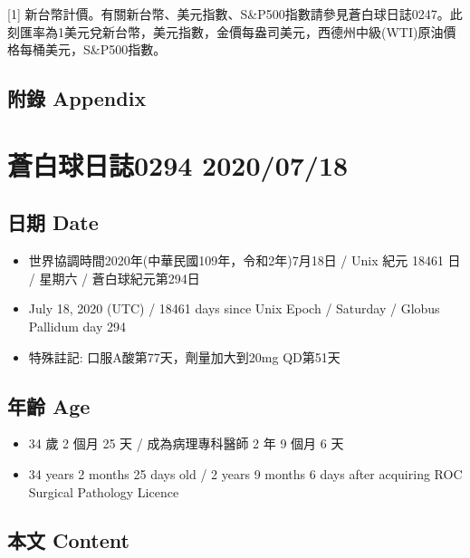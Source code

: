 \documentclass[a5paper, 11pt
]{book}
\providecommand{\tightlist}{%
  \setlength{\itemsep}{0pt}\setlength{\parskip}{0pt}}
\begin{document}
{[}1{]}
新台幣計價。有關新台幣、美元指數、S\&P500指數請參見蒼白球日誌0247。此刻匯率為1美元兌新台幣，美元指數，金價每盎司美元，西德州中級(WTI)原油價格每桶美元，S\&P500指數。

\hypertarget{ux9644ux9304-appendix-46}{%
\subsection{附錄 Appendix}\label{ux9644ux9304-appendix-46}}

\hypertarget{ux84bcux767dux7403ux65e5ux8a8c0294-20200718}{%
\section{蒼白球日誌0294
2020/07/18}\label{ux84bcux767dux7403ux65e5ux8a8c0294-20200718}}

\hypertarget{ux65e5ux671f-date-47}{%
\subsection{日期 Date}\label{ux65e5ux671f-date-47}}

\begin{itemize}
\tightlist
\item
  世界協調時間2020年(中華民國109年，令和2年)7月18日 / Unix 紀元 18461 日
  / 星期六 / 蒼白球紀元第294日
\item
  July 18, 2020 (UTC) / 18461 days since Unix Epoch / Saturday / Globus
  Pallidum day 294
\item
  特殊註記: 口服A酸第77天，劑量加大到20mg QD第51天
\end{itemize}

\hypertarget{ux5e74ux9f61-age-47}{%
\subsection{年齡 Age}\label{ux5e74ux9f61-age-47}}

\begin{itemize}
\tightlist
\item
  34 歲 2 個月 25 天 / 成為病理專科醫師 2 年 9 個月 6 天
\item
  34 years 2 months 25 days old / 2 years 9 months 6 days after
  acquiring ROC Surgical Pathology Licence
\end{itemize}

\hypertarget{ux672cux6587-content-47}{%
\subsection{本文 Content}\label{ux672cux6587-content-47}}
\end{document}

